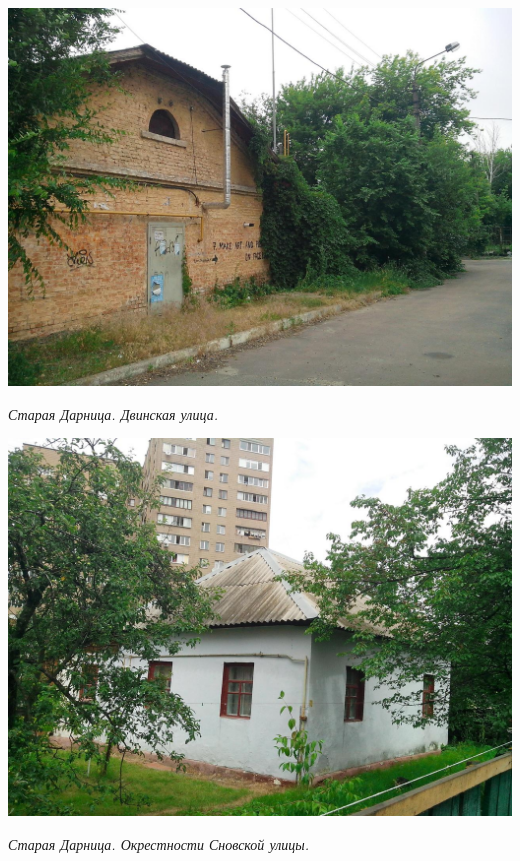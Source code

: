 \begin{center}
\includegraphics[width=\linewidth]{lpix/IMG_20160613_140656.jpg}

\textit{Старая Дарница. Двинская улица.}
\end{center}


\begin{center}
\includegraphics[width=0.95\linewidth]{lpix/IMG_20160613_141059.jpg}

\textit{Старая Дарница. Окрестности Сновской улицы.}
\end{center}


